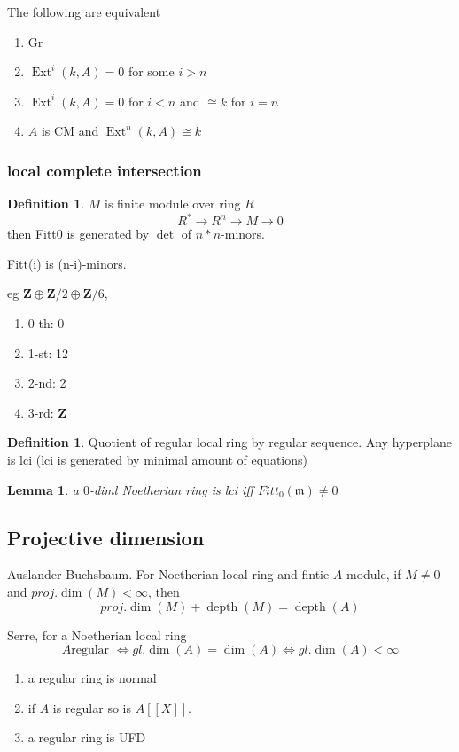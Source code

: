 \documentclass[leqno]{amsart}
\newcommand{\Z}{{\mathbf{Z}}}
\DeclareMathOperator{\depth}{depth}
\newcommand{\1}{\mathbf{1}}
\newcommand{\fm}{\mathfrak m}
\DeclareMathOperator{\Ext}{Ext}
\newtheorem{lem}[thm]{Lemma}
\theoremstyle{definition}
\newtheorem{defn}[thm]{Definition}
\theoremstyle{remark}
\begin{document}
The following are equivalent
\begin{enumerate}[label=(\alph*)]
	\item Gr
	\item $\Ext^i(k,A)=0$ for some  $i>n$
	\item $\Ext^i(k,A)=0$ for $i<n$ and  $\cong k$ for  $i=n$
	\item $A$ is CM and  $\Ext^n(k,A)\cong k$
\end{enumerate}

\subsubsection{local complete intersection}

\begin{defn}
	$M$ is finite module over ring  $R$
	 \[
		R^*\to R^n\to M\to 0
	\]
	then Fitt0 is generated by $\det$ of  $n*n$-minors.

	Fitt(i) is (n-i)-minors.
\end{defn}
eg $\Z\oplus \Z/2 \oplus \Z/6$,
\begin{enumerate}[label=(\alph*)]
	\item 0-th: 0
	\item 1-st: 12
	\item 2-nd: 2
	\item 3-rd: $\Z$
\end{enumerate}

\begin{defn}
	Quotient of regular local ring by regular sequence.
	Any hyperplane is lci
	(lci is generated by minimal amount of equations)
\end{defn}

\begin{lem}
	a $0$-diml Noetherian ring is lci 
	iff  $Fitt_0(\fm)\neq 0$
\end{lem}

\subsection{Projective dimension}

Auslander-Buchsbaum.
For Noetherian local ring and fintie $A$-module,
if  $M\neq 0$ and  $proj.\dim(M)<\infty$, then
\[
	proj.\dim(M)+\depth(M)=\depth(A)
\]

Serre, for a Noetherian local ring 
\[
	A \text{regular } \Longleftrightarrow
	gl.\dim(A)=\dim(A) \Longleftrightarrow
	gl.\dim(A)<\infty
\]

\begin{enumerate}[label=(\alph*)]
	\item a regular ring is normal
	\item if $A$ is regular so is  $A[[X]]$.
	\item a regular ring is UFD
\end{enumerate}
\end{document}
